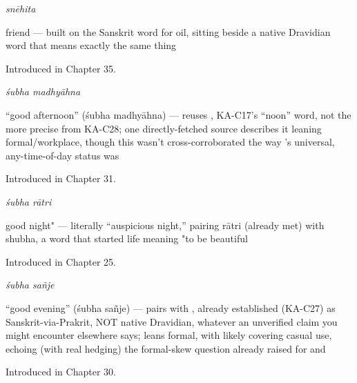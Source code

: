 \noindent\begin{minipage}[t]{\linewidth}
\raggedright
\textbf{}\enspace\emph{snēhita}\par
\small friend — built on the Sanskrit word for oil, sitting beside a native Dravidian word that means exactly the same thing\par
\footnotesize Introduced in Chapter 35.
\end{minipage}\par\medskip

\noindent\begin{minipage}[t]{\linewidth}
\raggedright
\textbf{ }\enspace\emph{śubha madhyāhna}\par
\small \textquotedblleft{}good afternoon\textquotedblright{} (śubha madhyāhna) — reuses , KA-C17's \textquotedblleft{}noon\textquotedblright{} word, not the more precise  from KA-C28; one directly-fetched source describes it leaning formal/workplace, though this wasn't cross-corroborated the way 's universal, any-time-of-day status was\par
\footnotesize Introduced in Chapter 31.
\end{minipage}\par\medskip

\noindent\begin{minipage}[t]{\linewidth}
\raggedright
\textbf{ }\enspace\emph{śubha rātri}\par
\small good night" — literally \textquotedblleft{}auspicious night,\textquotedblright{} pairing rātri (already met) with shubha, a word that started life meaning "to be beautiful\par
\footnotesize Introduced in Chapter 25.
\end{minipage}\par\medskip

\noindent\begin{minipage}[t]{\linewidth}
\raggedright
\textbf{ }\enspace\emph{śubha sañje}\par
\small \textquotedblleft{}good evening\textquotedblright{} (śubha sañje) — pairs with , already established (KA-C27) as Sanskrit-via-Prakrit, NOT native Dravidian, whatever an unverified claim you might encounter elsewhere says; leans formal, with  likely covering casual use, echoing (with real hedging) the formal-skew question already raised for  and \par
\footnotesize Introduced in Chapter 30.
\end{minipage}\par\medskip

